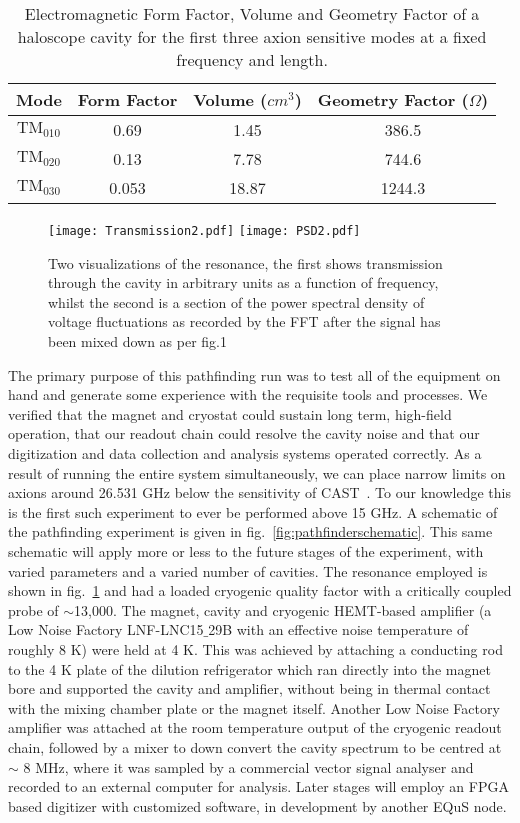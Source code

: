 \documentclass[preprint]{elsarticle}
\begin{document}
\begin{table}
	\centering
\begin{tabular}{|c|c|c|c|}
	\hline
Mode&Form Factor&Volume ($cm^3$)&Geometry Factor ($\Omega$)\\ \hline
$\text{TM}_{010}$&0.69&1.45&386.5\\ \hline
$\text{TM}_{020}$&0.13&7.78&744.6\\ \hline
$\text{TM}_{030}$&0.053&18.87&1244.3\\ \hline
\end{tabular}
	\caption{Electromagnetic Form Factor, Volume and Geometry Factor of a haloscope cavity for the first three axion sensitive modes at a fixed frequency and length.}
	\label{table:CVG}
\end{table}
\begin{figure}[t!]
	\centering
	\texttt{[image: Transmission2.pdf]}
	\texttt{[image: PSD2.pdf]}
	\caption{Two visualizations of the resonance, the first shows transmission through the cavity in arbitrary units as a function of frequency, whilst the second is a section of the power spectral density of voltage fluctuations as recorded by the FFT after the signal has been mixed down as per fig.1}
	\label{fig:resonance}
\end{figure}
The primary purpose of this pathfinding run was to test all of the equipment on hand and generate some experience with the requisite tools and processes. We verified that the magnet and cryostat could sustain long term, high-field operation, that our readout chain could resolve the cavity noise and that our digitization and data collection and analysis systems operated correctly. As a result of running the entire system simultaneously, we can place narrow limits on axions around 26.531 GHz below the sensitivity of CAST~\cite{CAST}. To our knowledge this is the first such experiment to ever be performed above 15 GHz.
A schematic of the pathfinding experiment is given in fig.~\ref{fig:pathfinderschematic}. This same schematic will apply more or less to the future stages of the experiment, with varied parameters and a varied number of cavities. The resonance employed is shown in fig.~\ref{fig:resonance} and had a loaded cryogenic quality factor with a critically coupled probe of $\sim$13,000. The magnet, cavity and cryogenic HEMT-based amplifier (a Low Noise Factory LNF-LNC15$\_$29B with an effective noise temperature of roughly 8 K) were held at 4 K. This was achieved by attaching a conducting rod to the 4 K plate of the dilution refrigerator which ran directly into the magnet bore and supported the cavity and amplifier, without being in thermal contact with the mixing chamber plate or the magnet itself. Another Low Noise Factory amplifier was attached at the room temperature output of the cryogenic readout chain, followed by a mixer to down convert the cavity spectrum to be centred at $\sim$ 8 MHz, where it was sampled by a commercial vector signal analyser and recorded to an external computer for analysis. Later stages will employ an FPGA based digitizer with customized software, in development by another EQuS node.
\end{document}
